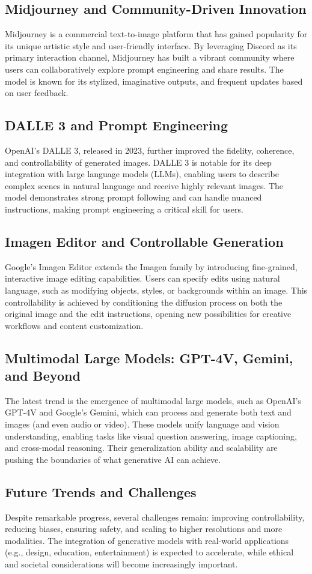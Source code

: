 \documentclass{article}
\begin{document}
\subsection{Midjourney and Community-Driven Innovation}
Midjourney is a commercial text-to-image platform that has gained popularity for its unique artistic style and user-friendly interface. By leveraging Discord as its primary interaction channel, Midjourney has built a vibrant community where users can collaboratively explore prompt engineering and share results. The model is known for its stylized, imaginative outputs, and frequent updates based on user feedback.

\subsection{DALL\textperiodcentered E 3 and Prompt Engineering}
OpenAI's DALL\textperiodcentered E 3, released in 2023, further improved the fidelity, coherence, and controllability of generated images. DALL\textperiodcentered E 3 is notable for its deep integration with large language models (LLMs), enabling users to describe complex scenes in natural language and receive highly relevant images. The model demonstrates strong prompt following and can handle nuanced instructions, making prompt engineering a critical skill for users.

\subsection{Imagen Editor and Controllable Generation}
Google's Imagen Editor extends the Imagen family by introducing fine-grained, interactive image editing capabilities. Users can specify edits using natural language, such as modifying objects, styles, or backgrounds within an image. This controllability is achieved by conditioning the diffusion process on both the original image and the edit instructions, opening new possibilities for creative workflows and content customization.

\subsection{Multimodal Large Models: GPT-4V, Gemini, and Beyond}
The latest trend is the emergence of multimodal large models, such as OpenAI's GPT-4V and Google's Gemini, which can process and generate both text and images (and even audio or video). These models unify language and vision understanding, enabling tasks like visual question answering, image captioning, and cross-modal reasoning. Their generalization ability and scalability are pushing the boundaries of what generative AI can achieve.

\subsection{Future Trends and Challenges}
Despite remarkable progress, several challenges remain: improving controllability, reducing biases, ensuring safety, and scaling to higher resolutions and more modalities. The integration of generative models with real-world applications (e.g., design, education, entertainment) is expected to accelerate, while ethical and societal considerations will become increasingly important.
\end{document}
